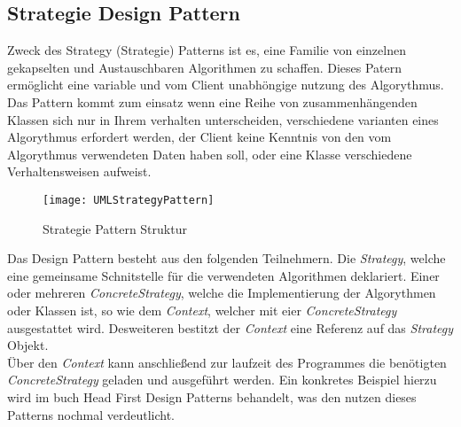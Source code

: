 \subsection{Strategie Design Pattern}
Zweck des Strategy (Strategie) Patterns ist es, eine Familie von einzelnen gekapselten und Austauschbaren Algorithmen zu schaffen. Dieses Patern ermöglicht eine variable und vom Client unabhöngige nutzung des Algorythmus.\\
Das Pattern kommt zum einsatz wenn eine Reihe von zusammenhängenden Klassen sich nur in Ihrem verhalten unterscheiden, verschiedene varianten eines Algorythmus erfordert werden, der Client keine Kenntnis von den vom Algorythmus verwendeten Daten haben soll, oder eine Klasse verschiedene Verhaltensweisen aufweist.\\
\begin{center}
    \begin{figure}[h]
     \centering
     \texttt{[image: UMLStrategyPattern]}
     \caption{Strategie Pattern Struktur \cite{DesignPatterns}}
    \label{fig:StrategyPattern}
    \end{figure}
\end{center}
\vspace{-2cm}
Das Design Pattern besteht aus den folgenden Teilnehmern. Die \textit{Strategy}, welche eine gemeinsame Schnitstelle für die verwendeten Algorithmen deklariert. Einer oder mehreren \textit{ConcreteStrategy}, welche die Implementierung der Algorythmen oder Klassen ist, so wie dem \textit{Context}, welcher mit eier \textit{ConcreteStrategy} ausgestattet wird. Desweiteren bestitzt der \textit{Context} eine Referenz auf das \textit{Strategy} Objekt.\cite[S.383 ff]{DesignPatterns}\\
Über den \textit{Context} kann anschließend zur laufzeit des Programmes die benötigten \textit{ConcreteStrategy} geladen und ausgeführt werden. 
Ein konkretes Beispiel hierzu wird im buch Head First Design Patterns \cite{HeadfirstDesignPatterns} behandelt, was den nutzen dieses Patterns nochmal verdeutlicht.